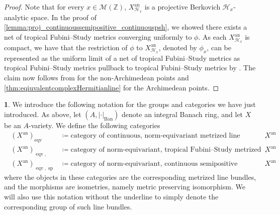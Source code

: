 \documentclass[11pt,reqno]{amsart}
\newcommand{\mZ}{\mathbb{Z}}
\newcommand{\sH}{{\mathscr H}}
\newcommand{\sM}{{\mathscr M}}
\theoremstyle{theorem}
\numberwithin{equation}{subsection}
\numberwithin{equation}{subsection}
\theoremstyle{definition}
\newtheorem{notation}[subsubsection]{\text{Notation}}
\theoremstyle{remark}
\numberwithin{equation}{subsubsection} \numberwithin{figure}{section}
\DeclareMathOperator{\an}{an}
\DeclareMathOperator{\acPic}{\widehat{\underline{Pic}}}
\DeclareMathOperator{\tFS}{FS^{\tau}}
\DeclareMathOperator{\Ban}{Ban}
\DeclareMathOperator{\psh}{psh}
\DeclareMathOperator{\semip}{sp}
\DeclareMathOperator{\eqv}{eqv}
\begin{document}
\begin{proof}
Note that for every $x\in \sM(\mZ)$, $X^{\an}_{\sH_x}$ is a projective Berkovich $\sH_x$-analytic space.
In the proof of \autoref{lemma:proj_continuoussemipositive_continuouspsh}, we showed there exists a net of tropical Fubini--Study metrics converging uniformly to $\phi$. 
As each $X^{\an}_{\sH_x}$ is compact, we have that the restriction of $
\phi$ to $X^{\an}_{\sH_x}$, denoted by $\phi_x$, can be represented as the uniform limit of a net of tropical Fubini--Study metrics as tropical Fubini--Study metrics pullback to tropical Fubini--Study metrics by \cite[Proposition 2.14.(7)]{PilleSchneider:Global}. 
The claim now follows from \cite[Proposition 5.20]{BoucksomJonsson:SingularPSH} for the non-Archimedean points and \autoref{thm:eqiuvalentcomplexHermitianline} for the Archimedean points. 
\end{proof}
\begin{notation}
We introduce the following notation for the groups and categories we have just introduced. 
As above, let $(A,|\cdot|_{\Ban})$ denote an integral Banach ring, and let $X$ be an $A$-variety. 
We define the following categories
\begin{align*}
\acPic(X^{\an})_{\eqv} &\coloneqq \text{category of continuous, norm-equivariant metrized line bundles on $X^{\an}$},\\
\acPic(X^{\an})_{\eqv,\tFS} &\coloneqq \text{category of norm-equivariant, tropical Fubini--Study metrized line bundles on $X^{\an}$},\\
\acPic(X^{\an})_{\eqv,\semip} &\coloneqq \text{category of norm-equivariant, continuous semipositive metrized line bundles on $X^{\an}$}.
\end{align*}
where the objects in these categories are the corresponding metrized line bundles, and the morphisms are isometries, namely metric preserving isomorphism. 
We will also use this notation without the underline to simply denote the corresponding group of such line bundles. 
\end{notation}
\end{document}
